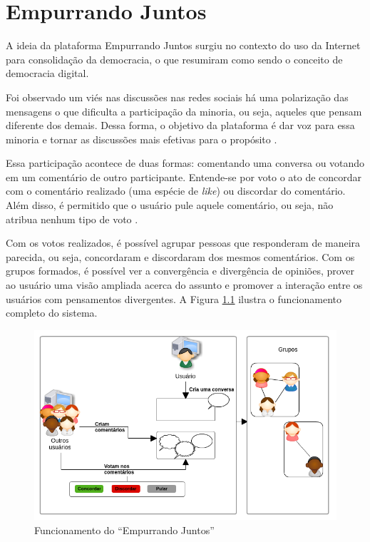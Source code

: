 \chapter{Empurrando Juntos} \label{cap:empurrandojuntos}

A ideia da plataforma Empurrando Juntos surgiu no contexto do uso da Internet para
consolidação da democracia, o que  resumiram como sendo o conceito de democracia digital.

Foi observado um viés nas discussões nas redes sociais há uma polarização das mensagens o que dificulta
a participação da minoria, ou seja, aqueles que pensam diferente dos demais. Dessa forma,
o objetivo da plataforma é dar voz para essa minoria e tornar as discussões mais efetivas para o propósito \cite{empurrandojuntos}. 


Essa participação 
acontece de duas formas: comentando uma conversa ou votando em um comentário de outro participante. Entende-se por voto
o ato de concordar com o comentário realizado (uma espécie de \textit{like}) ou discordar do comentário. Além disso, é permitido
que o usuário pule aquele comentário, ou seja, não atribua nenhum tipo de voto \cite{empurrandojuntos}. 

Com os votos realizados, é possível agrupar pessoas que responderam de maneira parecida, ou seja, concordaram e
discordaram dos mesmos comentários. Com os grupos formados, é possível ver a convergência e divergência de opiniões, 
prover ao usuário uma visão ampliada acerca do assunto e promover a interação entre os usuários com 
pensamentos divergentes. A Figura \ref{fig:resumo_ej} ilustra o funcionamento completo do sistema.

\begin{figure}[h!]
\centering
\includegraphics[scale=0.6]{figuras/resumo_ej.png}
\caption{Funcionamento do ``Empurrando Juntos''}
\label{fig:resumo_ej}
\end{figure}


